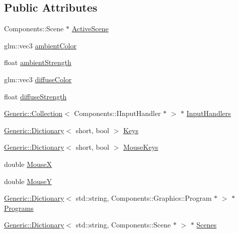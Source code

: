 \subsection*{Public Attributes}
\begin{DoxyCompactItemize}
\item 
Components\+::\+Scene $\ast$ \mbox{\hyperlink{classEngine_1_1BaseEngine_adb3dbc839da9d821e08b18d8a221698d}{Active\+Scene}}
\item 
glm\+::vec3 \mbox{\hyperlink{classApplication_1_1Engines_1_1LightEngine_ab22b7d03d1c3cd19214474fb56bdd2ee}{ambient\+Color}}
\item 
float \mbox{\hyperlink{classApplication_1_1Engines_1_1LightEngine_af97d743158c0e55c754b455e7066e6b0}{ambient\+Strength}}
\item 
glm\+::vec3 \mbox{\hyperlink{classApplication_1_1Engines_1_1LightEngine_a2247de4ba43b8d0e159ab90edd581363}{diffuse\+Color}}
\item 
float \mbox{\hyperlink{classApplication_1_1Engines_1_1LightEngine_ab2f3fb68d22dd1e6386833f4790a8eb6}{diffuse\+Strength}}
\item 
\mbox{\hyperlink{classGeneric_1_1Collection}{Generic\+::\+Collection}}$<$ Components\+::\+I\+Input\+Handler $\ast$ $>$ $\ast$ \mbox{\hyperlink{classEngine_1_1BaseEngine_a134fa082c5a64d62b76ddf926647e7cc}{Input\+Handlers}}
\item 
\mbox{\hyperlink{classGeneric_1_1Dictionary}{Generic\+::\+Dictionary}}$<$ short, bool $>$ \mbox{\hyperlink{classEngine_1_1BaseEngine_a65321a97e83f0a6ee90df3efac2d3307}{Keys}}
\item 
\mbox{\hyperlink{classGeneric_1_1Dictionary}{Generic\+::\+Dictionary}}$<$ short, bool $>$ \mbox{\hyperlink{classEngine_1_1BaseEngine_a3ee2bdddb66d45b8c808ffd937ba9c50}{Mouse\+Keys}}
\item 
double \mbox{\hyperlink{classEngine_1_1BaseEngine_a5fe085152ebe93346900407f6b41a034}{MouseX}}
\item 
double \mbox{\hyperlink{classEngine_1_1BaseEngine_a143c9c32dbbdc70bf1546ffe275bf384}{MouseY}}
\item 
\mbox{\hyperlink{classGeneric_1_1Dictionary}{Generic\+::\+Dictionary}}$<$ std\+::string, Components\+::\+Graphics\+::\+Program $\ast$ $>$ $\ast$ \mbox{\hyperlink{classEngine_1_1BaseEngine_ae0f86360ea3a384caefe443dd8f88601}{Programs}}
\item 
\mbox{\hyperlink{classGeneric_1_1Dictionary}{Generic\+::\+Dictionary}}$<$ std\+::string, Components\+::\+Scene $\ast$ $>$ $\ast$ \mbox{\hyperlink{classEngine_1_1BaseEngine_afd02af3c2fbe9bb734db014dec06585a}{Scenes}}

\end{DoxyCompactItemize}
